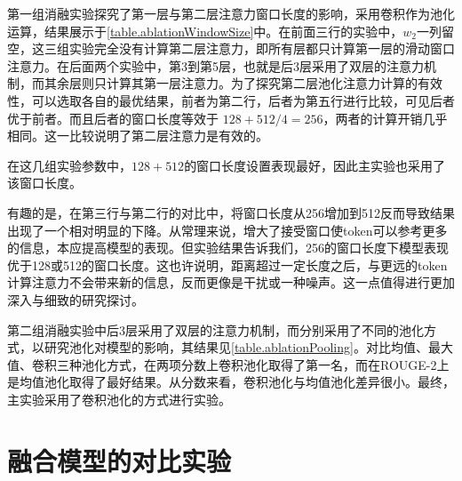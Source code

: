 第一组消融实验探究了第一层与第二层注意力窗口长度的影响，采用卷积作为池化运算，结果展示于\autoref{table.ablationWindowSize}中。在前面三行的实验中，$w_2$一列留空，这三组实验完全没有计算第二层注意力，即所有层都只计算第一层的滑动窗口注意力。在后面两个实验中，第3到第5层，也就是后3层采用了双层的注意力机制，而其余层则只计算其第一层注意力。为了探究第二层池化注意力计算的有效性，可以选取各自的最优结果，前者为第二行，后者为第五行进行比较，可见后者优于前者。而且后者的窗口长度等效于 $128+512/4=256$，两者的计算开销几乎相同。这一比较说明了第二层注意力是有效的。

在这几组实验参数中，$128+512$的窗口长度设置表现最好，因此主实验也采用了该窗口长度。

有趣的是，在第三行与第二行的对比中，将窗口长度从256增加到512反而导致结果出现了一个相对明显的下降。从常理来说，增大了接受窗口使token可以参考更多的信息，本应提高模型的表现。但实验结果告诉我们，256的窗口长度下模型表现优于128或512的窗口长度。这也许说明，距离超过一定长度之后，与更远的token计算注意力不会带来新的信息，反而更像是干扰或一种噪声。这一点值得进行更加深入与细致的研究探讨。

\begin{table}[ht]
\caption{Poolingformer$_{base}$在arXiv测试集上关于池化方式的消融实验结果。}
\label{table.ablationPooling}
\begin{center}
\end{center}
\end{table}

第二组消融实验中后3层采用了双层的注意力机制，而分别采用了不同的池化方式，以研究池化对模型的影响，其结果见\autoref{table.ablationPooling}。对比均值、最大值、卷积三种池化方式，在两项分数上卷积池化取得了第一名，而在ROUGE-2上是均值池化取得了最好结果。从分数来看，卷积池化与均值池化差异很小。最终，主实验采用了卷积池化的方式进行实验。

\section{融合模型的对比实验}

